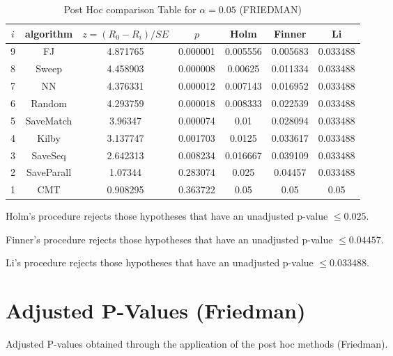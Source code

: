 \documentclass[a4paper,10pt]{article}
\begin{document}
\begin{landscape}
\begin{table}[!htp]
\centering\footnotesize
\begin{tabular}{ccccccc}
$i$&algorithm&$z=(R_0 - R_i)/SE$&$p$&Holm &Finner&Li\\
\hline9&FJ&4.871765&0.000001&0.005556&0.005683&0.033488\\8&Sweep&4.458903&0.000008&0.00625&0.011334&0.033488\\7&NN&4.376331&0.000012&0.007143&0.016952&0.033488\\6&Random&4.293759&0.000018&0.008333&0.022539&0.033488\\5&SaveMatch&3.96347&0.000074&0.01&0.028094&0.033488\\4&Kilby&3.137747&0.001703&0.0125&0.033617&0.033488\\3&SaveSeq&2.642313&0.008234&0.016667&0.039109&0.033488\\2&SaveParall&1.07344&0.283074&0.025&0.04457&0.033488\\1&CMT&0.908295&0.363722&0.05&0.05&0.05\\\hline
\end{tabular}
\caption{Post Hoc comparison Table for $\alpha=0.05$ (FRIEDMAN)}
\end{table}Holm's procedure rejects those hypotheses that have an unadjusted p-value $\le0.025$.

Finner's procedure rejects those hypotheses that have an unadjusted p-value $\le0.04457$.

Li's procedure rejects those hypotheses that have an unadjusted p-value $\le0.033488$.


\newpage

\section{Adjusted P-Values (Friedman)}


Adjusted P-values obtained through the application of the post hoc methods (Friedman).


\end{landscape}
\end{document}
